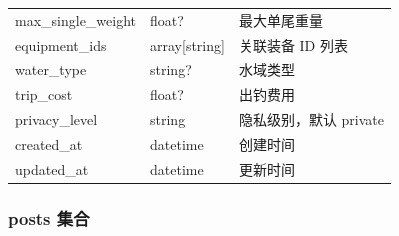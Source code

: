 \documentclass[12pt,a4paper]{ctexart}
\begin{document}
\begin{table}[H]
\begin{tabular}{p{3.5cm}p{2cm}p{6.5cm}}
    max\_single\_weight & float? & 最大单尾重量 \\
    equipment\_ids & array[string] & 关联装备 ID 列表 \\
    water\_type & string? & 水域类型 \\
    trip\_cost & float? & 出钓费用 \\
    privacy\_level & string & 隐私级别，默认 private \\
    created\_at & datetime & 创建时间 \\
    updated\_at & datetime & 更新时间 \\
    \bottomrule
  \end{tabular}
\end{table}

\subsubsection{posts 集合}
\end{document}
